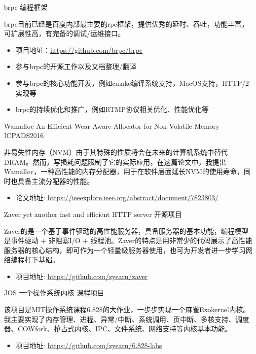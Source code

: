\documentclass[11pt,a4paper]{moderncv}
\begin{document}
{brpc}
{编程框架}
{}
{}
{
brpc目前已经是百度内部最主要的rpc框架，提供优秀的延时、吞吐，功能丰富，可扩展性高，有完备的调试/运维接口。
\begin{itemize}
    \item 项目地址：\url{https://github.com/brpc/brpc}
    \item 参与brpc的开源工作以及文档整理/翻译
    \item 参与brpc的核心功能开发，例如cmake编译系统支持，MacOS支持，HTTP/2实现等
    \item brpc的持续优化和推广，例如RTMP协议相关优化、性能优化等
\end{itemize}
}
\vspace*{0.4\baselineskip}

{Wamalloc}
{An Efficient Wear-Aware Allocator for Non-Volatile Memory}
{ICPADS2016}
{}
{
非易失性内存（NVM）由于其特殊的性质将会在未来的计算机系统中替代DRAM。然而，写损耗问题限制了它的实际应用，在这篇论文中，我提出Wamalloc，一种高性能的内存分配器，用于在软件层面延长NVM的使用寿命，同时也具备主流分配器的性能。
\begin{itemize}
    \item 论文地址: \url{https://ieeexplore.ieee.org/abstract/document/7823803/}
\end{itemize}
}
\vspace*{0.4\baselineskip}


{Zaver}
{yet another fast and efficient HTTP server}
{开源项目}
{}
{
Zaver的是一个基于事件驱动的高性能服务器，具备服务器的基本功能，编程模型是事件驱动 + 非阻塞I/O + 线程池。Zaver的特点是用非常少的代码展示了高性能服务器的核心结构，即可作为一个轻量级服务器使用，也可为开发者进一步学习网络编程打下基础。
\begin{itemize}
    \item 项目地址: \url{https://github.com/zyearn/zaver}
\end{itemize}
}
\vspace*{0.4\baselineskip}

{JOS}
{一个操作系统内核}
{课程项目}
{}
{
该项目是MIT操作系统课程6.828的大作业，一步步实现一个麻雀Exokernel内核。我主要实现了内存管理、进程、异常/中断、系统调用、页中断、多核支持、调度器、COWfork、抢占式内核、IPC、文件系统、网络支持等内核基本功能。
\begin{itemize}
    \item 项目地址: \url{https://github.com/zyearn/6.828-labs}
\end{itemize}
}
\vspace*{0.4\baselineskip}
\end{document}
